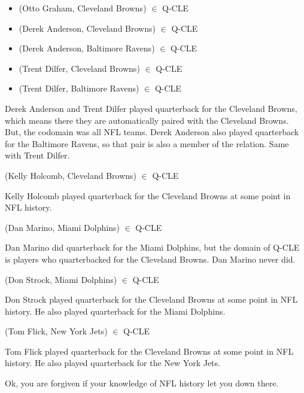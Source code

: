 \documentclass{ximera}
\begin{document}
\begin{example}
\begin{itemize}
\item (Otto Graham, Cleveland Browns) $\in$ Q-CLE
\item (Derek Anderson, Cleveland Browns) $\in$ Q-CLE
\item (Derek Anderson, Baltimore Ravens) $\in$ Q-CLE
\item (Trent Dilfer, Cleveland Browns) $\in$ Q-CLE
\item (Trent Dilfer, Baltimore Ravens) $\in$ Q-CLE
\end{itemize}

Derek Anderson and Trent Dilfer played quarterback for the Cleveland Browns, which means there they are automatically paired with the Cleveland Browns.  But, the codomain was all NFL teams.  Derek Anderson also played quarterback for the Baltimore Ravens, so that pair is also a member of the relation.  Same with Trent Dilfer.


\end{example}





\begin{problem}  (Kelly Holcomb, Cleveland Browns) $\in$ Q-CLE
\begin{feedback}
Kelly Holcomb played quarterback for the Cleveland Browns at some point in NFL history.
\end{feedback}
\end{problem}



\begin{problem}  (Dan Marino, Miami Dolphins) $\in$ Q-CLE
\begin{feedback}
Dan Marino did quarterback for the Miami Dolphins, but the domain of Q-CLE is players who quarterbacked for the Cleveland Browns.  Dan Marino never did. 
\end{feedback}
\end{problem}




\begin{problem}  (Don Strock, Miami Dolphins) $\in$ Q-CLE
\begin{feedback}
Don Strock played quarterback for the Cleveland Browns at some point in NFL history. He also played quarterback for the Miami Dolphins.
\end{feedback}
\end{problem}



\begin{problem}  (Tom Flick, New York Jets) $\in$ Q-CLE
\begin{feedback}
Tom Flick played quarterback for the Cleveland Browns at some point in NFL history. He also played quarterback for the New York Jets.\end{feedback}
\end{problem}


Ok, you are forgiven if your knowledge of NFL history let you down there.
\end{document}
